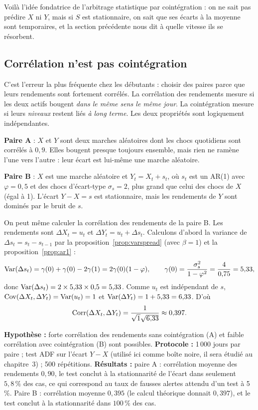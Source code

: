 \documentclass[11pt,a4paper]{article}
\begin{document}
Voilà l'idée fondatrice de l'arbitrage statistique par cointégration : on ne sait pas prédire $X$ ni $Y$, mais si $S$ est stationnaire, on sait que ses écarts à la moyenne sont temporaires, et la section précédente nous dit à quelle vitesse ils se résorbent.

\subsection{Corrélation n'est pas cointégration}

C'est l'erreur la plus fréquente chez les débutants : choisir des paires parce que leurs rendements sont fortement corrélés. La corrélation des rendements mesure si les deux actifs bougent \emph{dans le même sens le même jour}. La cointégration mesure si leurs \emph{niveaux} restent liés \emph{à long terme}. Les deux propriétés sont logiquement indépendantes.

\begin{example}
\textbf{Paire A} : $X$ et $Y$ sont deux marches aléatoires dont les chocs quotidiens sont corrélés à $0{,}9$. Elles bougent presque toujours ensemble, mais rien ne ramène l'une vers l'autre : leur écart est lui-même une marche aléatoire.

\textbf{Paire B} : $X$ est une marche aléatoire et $Y_t = X_t + s_t$, où $s_t$ est un AR(1) avec $\varphi = 0{,}5$ et des chocs d'écart-type $\sigma_s = 2$, plus grand que celui des chocs de $X$ (égal à 1). L'écart $Y - X = s$ est stationnaire, mais les rendements de $Y$ sont dominés par le bruit de $s$.
\end{example}

On peut même calculer la corrélation des rendements de la paire B. Les rendements sont $\Delta X_t = u_t$ et $\Delta Y_t = u_t + \Delta s_t$. Calculons d'abord la variance de $\Delta s_t = s_t - s_{t-1}$ par la proposition~\ref{prop:varspread} (avec $\beta = 1$) et la proposition~\ref{prop:ar1} :
\[
\operatorname{Var}(\Delta s_t) = \gamma(0) + \gamma(0) - 2\gamma(1) = 2\gamma(0)(1-\varphi), \qquad \gamma(0) = \frac{\sigma_s^2}{1-\varphi^2} = \frac{4}{0{,}75} = 5{,}33,
\]
donc $\operatorname{Var}(\Delta s_t) = 2\times 5{,}33\times 0{,}5 = 5{,}33$. Comme $u_t$ est indépendant de $s$, $\operatorname{Cov}(\Delta X_t,\Delta Y_t) = \operatorname{Var}(u_t) = 1$ et $\operatorname{Var}(\Delta Y_t) = 1 + 5{,}33 = 6{,}33$. D'où
\[
\operatorname{Corr}(\Delta X_t,\Delta Y_t) = \frac{1}{\sqrt{1}\sqrt{6{,}33}} \approx 0{,}397.
\]

\begin{codebox}
\textbf{Hypothèse :} forte corrélation des rendements sans cointégration (A) et faible corrélation avec cointégration (B) sont possibles. \textbf{Protocole :} 1\,000 jours par paire ; test ADF sur l'écart $Y-X$ (utilisé ici comme boîte noire, il sera étudié au chapitre~3) ; 500 répétitions. \textbf{Résultats :} paire A : corrélation moyenne des rendements $0{,}90$, le test conclut à la stationnarité de l'écart dans seulement $5{,}8\,\%$ des cas, ce qui correspond au taux de fausses alertes attendu d'un test à 5\,\%. Paire B : corrélation moyenne $0{,}395$ (le calcul théorique donnait $0{,}397$), et le test conclut à la stationnarité dans $100\,\%$ des cas.
\end{codebox}
\end{document}
